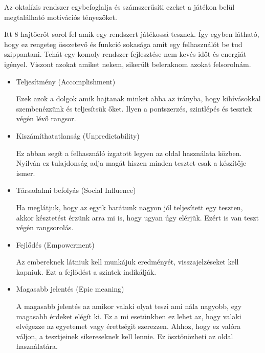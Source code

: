 Az oktalízis rendszer  egybefoglalja és számszerűsíti ezeket a játékon belül megtalálható motivációs tényezőket. \newline

Itt 8 hajtőerőt sorol fel amik egy rendszert játékossá tesznek. Így egyben látható, hogy ez rengeteg összetevő és funkció sokasága amit egy felhasználót be tud szippantani. Tehát egy komoly rendszer fejlesztése nem kevés időt és energiát igényel. Viszont azokat amiket nekem, sikerült beleraknom azokat felsorolnám.

\begin{itemize}
    \item {Teljesítmény (Accomplishment)}
          \begin{addmargin}[\parindent]{0pt}
              Ezek azok a dolgok amik hajtanak minket abba az irányba, hogy kihívásokkal szembenézzünk és teljesítsük őket. Ilyen a pontszerzés, szintlépés és tesztek végén lévő rangsor.
          \end{addmargin}
    \item {Kiszámíthatatlanság (Unpredictability)}
          \begin{addmargin}[\parindent]{0pt}
              Ez abban segít a felhasználó izgatott legyen az oldal használata közben. Nyilván ez tulajdonság adja magát hiszen minden tesztet csak a készítője ismer.
          \end{addmargin}
    \item {Társadalmi befolyás (Social Influence)}
          \begin{addmargin}[\parindent]{0pt}
              Ha meglátjuk, hogy az egyik barátunk nagyon jól teljesített egy teszten, akkor késztetést érzünk arra mi is, hogy ugyan úgy elérjük. Ezért is van teszt végén rangsorolás.
          \end{addmargin}
    \item {Fejlődés (Empowerment)}
          \begin{addmargin}[\parindent]{0pt}
            Az embereknek látniuk kell munkájuk eredményét, visszajelzéseket kell kapniuk. Ezt a fejlődést a szintek indikálják.
          \end{addmargin}
    \item {Magasabb jelentés (Epic meaning)}
          \begin{addmargin}[\parindent]{0pt}
              A magasabb jelentés az amikor valaki olyat teszi ami nála nagyobb, egy magasabb érdeket elégít ki. Ez a mi esetünkben ez lehet az, hogy valaki elvégezze az egyetemet vagy érettségit szerezzen. Ahhoz, hogy ez valóra váljon, a tesztjeinek sikereseknek kell lennie. Ez ösztönözheti az oldal használatára.
          \end{addmargin}
\end{itemize}

